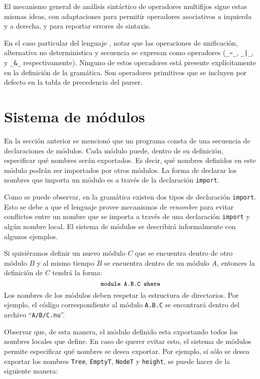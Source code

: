 El mecanismo general de análisis sintáctico de operadores multifijos sigue
estas mismas ideas, con adaptaciones para permitir operadores asociativos a
izquierda y a derecha, y para reportar errores de sintaxis.

En el caso particular del lenguaje \nuflo, notar que las operaciones
de unificación, alternativa no deterministica y secuencia se expresan
como operadores (\verb|_~_|, \verb`_|_`, y \verb|_&_| respectivamente). 
Ninguno de estos operadores está presente explícitamente en la definición
de la gramática. Son operadores primitivos que se incluyen
por defecto en la tabla de precedencia del parser.

\section{Sistema de módulos}

En la sección anterior se mencionó que un programa consta de una secuencia de
declaraciones de módulos.
Cada módulo puede, dentro de su definición,
especificar qué nombres serán exportados.
Es decir, qué nombres definidos en este módulo podrán ser importados
por otros módulos.
La forma de declarar los nombres que importa un módulo es a través de
la declaración \texttt{import}.

Como se puede observar, en la gramática existen dos tipos de declaración \texttt{import}.
Esto se debe a que el lenguaje provee mecanismos de {\em renombre}
para evitar conflictos entre un nombre que se importa a través de una declaración \texttt{import}
y algún nombre local.
El sistema de módulos se describirá informalmente con algunos ejemplos.
\medskip

Si quisiéramos definir un nuevo módulo $C$ que se encuentra dentro de otro módulo $B$
y al mismo tiempo $B$ se encuentra dentro de un módulo $A$,
entonces la definición de $C$ tendrá la forma:
\[ {\small \texttt{module A.B.C where}} \]
Los nombres de los módulos deben respetar la estructura de directorios.
Por ejemplo, el código correspondiente al módulo \verb|A.B.C|
se encontrará dentro del archivo ``\verb|A/B/C.nu|''.

Observar que, de esta manera, el módulo definido esta exportando todos los
nombres locales que define.
En caso de querer evitar esto, el sistema de módulos permite especificar
qué nombres se desea exportar.
Por ejemplo, si sólo se desea exportar los nombres
\verb|Tree|, \verb|EmptyT|, \verb|NodeT| y \verb|height|,
se puede hacer de la siguiente manera:

